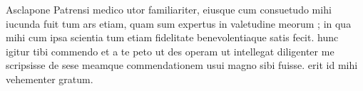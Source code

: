 


Asclapone Patrensi medico utor familiariter, eiusque cum consuetudo mihi iucunda fuit tum ars etiam, quam sum expertus in valetudine meorum ; in qua mihi cum ipsa scientia tum etiam fidelitate benevolentiaque satis fecit. hunc igitur tibi commendo et a te peto ut des operam ut
intellegat diligenter me scripsisse de sese meamque commendationem usui magno sibi fuisse. erit id mihi vehementer gratum.
